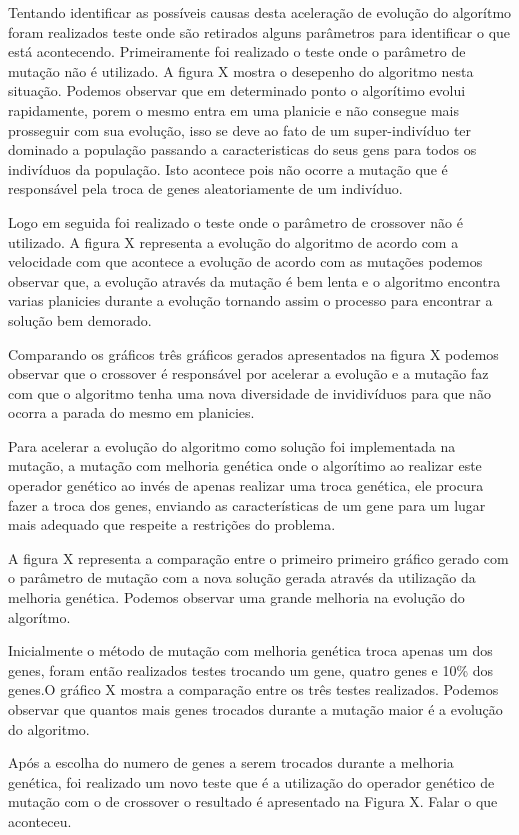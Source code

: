 \documentclass{abntpuc}
\begin{document}
Tentando identificar as possíveis causas desta aceleração de evolução do algorítmo foram realizados teste onde são retirados alguns parâmetros para identificar o que está acontecendo. Primeiramente foi realizado o teste onde o parâmetro de mutação não é utilizado. A figura X mostra o desepenho do algoritmo nesta situação. Podemos observar que em determinado ponto o algorítimo evolui rapidamente, porem o mesmo entra em uma planicie e não consegue mais prosseguir com sua evolução, isso se deve ao fato de um super-indivíduo ter dominado a população passando a caracteristicas do seus gens para todos os indivíduos da população. Isto acontece pois não ocorre a mutação que é responsável pela troca de genes aleatoriamente de um indivíduo.

Logo em seguida foi realizado o teste onde o parâmetro de crossover não é utilizado. A figura X representa a evolução do algoritmo de acordo com a velocidade com que acontece a evolução de acordo com as mutações podemos observar que, a evolução através da mutação é bem lenta e o algoritmo encontra varias planicies durante a evolução tornando assim o processo para encontrar a solução bem demorado.

Comparando os gráficos três gráficos gerados apresentados na figura X podemos observar que o crossover é responsável por acelerar a evolução e a mutação faz com que o algoritmo tenha uma nova diversidade de invidivíduos para que não ocorra a parada do mesmo em planicies.


Para acelerar a evolução do algoritmo como solução foi implementada na mutação, a mutação com melhoria genética onde o algorítimo ao realizar este operador genético ao invés de apenas realizar uma troca genética, ele procura fazer a troca dos genes, enviando as características de um gene para um lugar mais adequado que respeite a restrições do problema.

A figura X representa a comparação entre o primeiro primeiro gráfico gerado com o parâmetro de mutação com a nova solução gerada através da utilização da melhoria genética. Podemos observar uma grande melhoria na evolução do algorítmo.


Inicialmente o método de mutação com melhoria genética troca apenas um dos genes, foram então realizados testes trocando um gene, quatro genes e 10\% dos genes.O gráfico X mostra a comparação entre os três testes realizados. Podemos observar que quantos mais genes trocados durante a mutação maior é a evolução do algoritmo.

Após a escolha do numero de genes a serem trocados durante a melhoria genética, foi realizado um novo teste que é a utilização do operador genético de mutação com o de crossover o resultado é apresentado na Figura X. Falar o que aconteceu.
\end{document}
